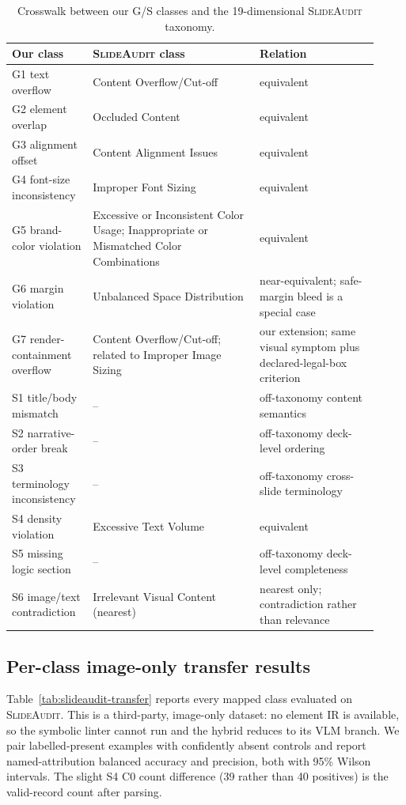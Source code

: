 \documentclass[11pt]{article}
\newcommand{\g}[1]{\textsf{#1}}
\begin{document}
\begin{table}[h]
\centering
\footnotesize
\setlength{\tabcolsep}{3pt}
\caption{Crosswalk between our G/S classes and the 19-dimensional \textsc{SlideAudit} taxonomy.}
\label{tab:slideaudit-crosswalk}
\begin{tabular}{@{}p{0.20\linewidth}p{0.42\linewidth}p{0.30\linewidth}@{}}
\toprule
Our class & \textsc{SlideAudit} class & Relation \\
\midrule
\g{G1} text overflow & Content Overflow/Cut-off & equivalent \\
\g{G2} element overlap & Occluded Content & equivalent \\
\g{G3} alignment offset & Content Alignment Issues & equivalent \\
\g{G4} font-size inconsistency & Improper Font Sizing & equivalent \\
\g{G5} brand-color violation & Excessive or Inconsistent Color Usage; Inappropriate or Mismatched Color Combinations & equivalent \\
\g{G6} margin violation & Unbalanced Space Distribution & near-equivalent; safe-margin bleed is a special case \\
\g{G7} render-containment overflow & Content Overflow/Cut-off; related to Improper Image Sizing & our extension; same visual symptom plus declared-legal-box criterion \\
\g{S1} title/body mismatch & -- & off-taxonomy content semantics \\
\g{S2} narrative-order break & -- & off-taxonomy deck-level ordering \\
\g{S3} terminology inconsistency & -- & off-taxonomy cross-slide terminology \\
\g{S4} density violation & Excessive Text Volume & equivalent \\
\g{S5} missing logic section & -- & off-taxonomy deck-level completeness \\
\g{S6} image/text contradiction & Irrelevant Visual Content (nearest) & nearest only; contradiction rather than relevance \\
\bottomrule
\end{tabular}
\end{table}

\subsection{Per-class image-only transfer results}\label{app:slideaudit-transfer}

Table~\ref{tab:slideaudit-transfer} reports every mapped class evaluated on
\textsc{SlideAudit}. This is a third-party, image-only dataset: no element IR
is available, so the symbolic linter cannot run and the hybrid reduces to its
VLM branch. We pair labelled-present examples with confidently absent controls
and report named-attribution balanced accuracy and precision, both with 95\%
Wilson intervals. The slight \g{S4} C0 count difference (39 rather than 40
positives) is the valid-record count after parsing.
\end{document}
